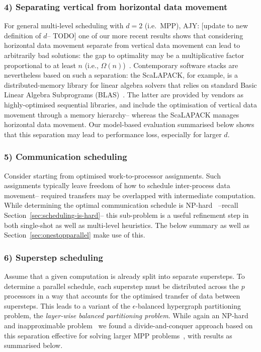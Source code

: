 \documentclass[oneside,reqno, a4paper]{amsart}
\numberwithin{equation}{section}
\newcommand{\ajy}[1]{{\color{orange} \sf AJY: [#1]}}
\begin{document}
\subsubsection*{4) Separating vertical from horizontal data movement}

For general multi-level scheduling with $d=2$ (i.e.\ MPP),
\ajy{update to new definition of $d$-- TODO}
one of our more recent results shows that considering horizontal data movement separate from vertical data movement can lead to arbitrarily bad solutions:
the gap to optimality may be a multiplicative factor proportional to at least $n$ (i.e., $\Omega(n)$)~\cite[Theorem 4.1]{multiBSP_opdas}.
Contemporary software stacks %
are nevertheless based on such a separation:
the ScaLAPACK,
for example,
is a distributed-memory library for linear algebra solvers that relies on standard Basic Linear Algebra Subprograms (BLAS)~\cite{dongarra90,choi92}.
The latter are provided by vendors as highly-optimised sequential libraries,
and include the optimisation of vertical data movement through a memory hierarchy--
whereas the ScaLAPACK manages horizontal data movement.
Our model-based evaluation summarised below
shows that this separation may lead to performance loss,
especially for larger $d$.

\subsubsection*{5) Communication scheduling}

Consider starting from optimised work-to-processor assignments.
Such assignments typically leave freedom of how to schedule inter-process data movement--
required transfers may be overlapped with intermediate computation.
While determining the optimal communication schedule is NP-hard~\cite{BSP_DAG_opdas}
--recall Section~\ref{sec:scheduling-is-hard}--
this sub-problem is a useful refinement step in both single-shot as well as multi-level heuristics.
The below summary as well as Section~\ref{sec:onestopparallel} make use of this.

\subsubsection*{6) Superstep scheduling}

Assume that a given computation is already split into separate supersteps.
To determine a parallel schedule,
each superstep must be distributed across the $p$ processors in a way that accounts for the optimised transfer of data between supersteps.
This leads to a variant of the $\epsilon$-balanced hypergraph partitioning problem,
the \emph{layer-wise balanced partitioning problem}.
While again an NP-hard and inapproximable problem~\cite[Theorem 5.2]{hypergraphs_opdas}
we found a divide-and-conquer approach based on this separation effective for solving larger MPP problems~\cite{multiBSP_opdas},
with results as summarised below.
\end{document}
